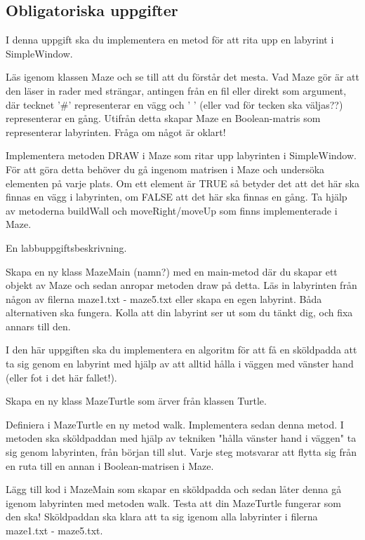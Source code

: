 \subsection{Obligatoriska uppgifter}

\Task I denna uppgift ska du implementera en metod för att rita upp en labyrint i SimpleWindow.

\Subtask Läs igenom klassen Maze och se till att du förstår det mesta. Vad Maze gör är att den läser in rader med strängar, antingen från en fil eller direkt som argument, där tecknet '#' representerar en vägg och ' ' (eller vad för tecken ska väljas??) representerar en gång. Utifrån detta skapar Maze en Boolean-matris som representerar labyrinten. Fråga om något är oklart!

\Subtask Implementera metoden DRAW i Maze som ritar upp labyrinten i SimpleWindow. För att göra detta behöver du gå ingenom matrisen i Maze och undersöka elementen på varje plats. Om ett element är TRUE så betyder det att det här ska finnas en vägg i labyrinten, om FALSE att det här ska finnas en gång. Ta hjälp av metoderna buildWall och moveRight/moveUp som finns implementerade i Maze.

\Task En labbuppgiftsbeskrivning.

\Subtask Skapa en ny klass MazeMain (namn?) med en main-metod där du skapar ett objekt av Maze och sedan anropar metoden draw på detta. Läs in labyrinten från någon av filerna maze1.txt - maze5.txt eller skapa en egen labyrint. Båda alternativen ska fungera. Kolla att din labyrint ser ut som du tänkt dig, och fixa annars till den.

\Task I den här uppgiften ska du implementera en algoritm för att få en sköldpadda att ta sig genom en labyrint med hjälp av att alltid hålla i väggen med vänster hand (eller fot i det här fallet!).

\Subtask Skapa en ny klass MazeTurtle som ärver från klassen Turtle.

\Subtask Definiera i MazeTurtle en ny metod walk. Implementera sedan denna metod. I metoden ska sköldpaddan med hjälp av tekniken "hålla vänster hand i väggen" ta sig genom labyrinten, från början till slut. Varje steg motsvarar att flytta sig från en ruta till en annan i Boolean-matrisen i Maze.

\Subtask Lägg till kod i MazeMain som skapar en sköldpadda och sedan låter denna gå igenom labyrinten med metoden walk. Testa att din MazeTurtle fungerar som den ska! Sköldpaddan ska klara att ta sig igenom alla labyrinter i filerna maze1.txt - maze5.txt.

